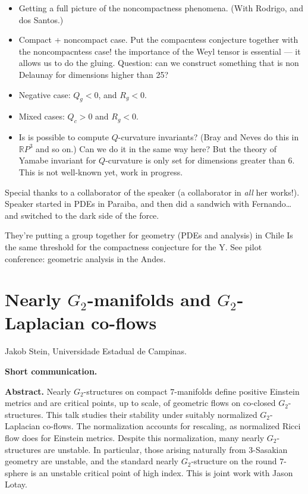 \begin{itemize}
\item Getting a full picture of the
noncompactness phenomena. (With Rodrigo, and
dos Santos.)

\item Compact + noncompact case. Put the
compacntess conjecture together with the
noncompacntess case! the importance of the
Weyl tensor is essential --- it allows us to
do the gluing. Question: can we construct
something that is non Delaunay for
dimensions higher than 25?

\item Negative case: $Q_g <0$, and $R_g<0$.
\item Mixed cases: $Q_c>0$ and $R_g<0$.
\item Is is possible to compute
$Q$-curvature invariants? (Bray and Neves do
this in $\mathbb{R}P^3$ and so on.)
Can we do it in the same way here?
But the theory of Yamabe invariant for
$Q$-curvature is only set for dimensions
greater than 6. This is not well-known yet,
work in progress.
\end{itemize}

\noindent
Special thanks to a collaborator of the
speaker (a collaborator in {\it all} her
works!). Speaker started in PDEs in Paraiba,
and then did a sandwich with Fernando… and
switched to the dark side of the force.

They're putting a group together for
geometry (PDEs and analysis) in Chile Is the same
threshold for the compactness conjecture for
the Y. See
pilot 
conference: geometric analysis in the Andes.




\section{Nearly $G_2$-manifolds and
$G_2$-Laplacian co-flows}
\label{%
section-nearly-g2-laplacian-coflows%
}

\medskip\noindent
Jakob Stein,
Universidade Estadual de Campinas.

\medskip\noindent
{\bf Short communication.}

\medskip\noindent
{\bf Abstract.}
Nearly $G_2$-structures on compact
$7$-manifolds define positive Einstein
metrics and are critical points, up to
scale, of geometric flows on co-closed
$G_2$-structures. This talk studies their
stability under suitably normalized
$G_2$-Laplacian co-flows. The normalization
accounts for rescaling, as normalized Ricci
flow does for Einstein metrics. Despite
this normalization, many nearly
$G_2$-structures are unstable. In
particular, those arising naturally from
$3$-Sasakian geometry are unstable, and
the standard nearly $G_2$-structure on the
round $7$-sphere is an unstable critical
point of high index. This is joint work
with Jason Lotay.


